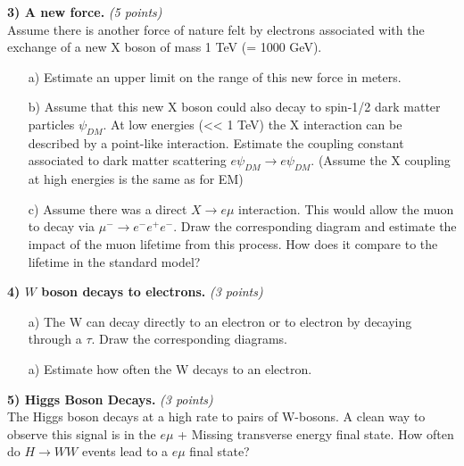 {\textbf{3) A new force. } \hfill \textit{(5 points)}\\
Assume there is another force of nature felt by electrons associated with the exchange of a new X boson of mass 1 TeV (= 1000 GeV).
\begin{itemize}
\item[a)]{ Estimate an upper limit on the range of this new force in meters.
}
\item[b)]{ Assume that this new X boson could also decay to spin-1/2 dark matter particles $\psi_{DM}$. At low energies (<< 1 TeV) the X interaction can be described by a point-like interaction. Estimate the coupling constant associated to dark matter scattering $e \psi_{DM} \rightarrow e \psi_{DM}$.   (Assume the X coupling at high energies is the same as for EM)  }
\item[c)]{ Assume there was a direct $X\rightarrow e\mu$ interaction. This would allow the muon to decay via $\mu^- \rightarrow e^-e^+e^-$. Draw the corresponding diagram and estimate the impact of the muon lifetime from this process.  How does it compare to the lifetime in the standard model?     }
\end{itemize}

\clearpage

\textbf{4)  $W$ boson decays to electrons. } \hfill \textit{(3 points)}\\
\begin{itemize}
\item[a)]{ The W can decay directly to an electron or to electron by decaying through a $\tau$. Draw the corresponding diagrams.}
\item[a)]{ Estimate how often the W decays to an electron. }
\end{itemize}           

\vspace*{0.25in}

\textbf{5) Higgs Boson Decays. } \hfill \textit{(3 points)}\\
The Higgs boson decays at a high rate to pairs of W-bosons.
A clean way to observe this signal is in the $e\mu$ + Missing transverse energy final state. How often do $H\rightarrow WW$ events lead to a $e\mu$ final state?

\vspace*{0.25in}

}
